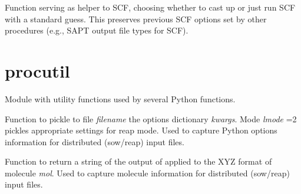 \documentclass[letterpaper,10pt,english]{sphinxmanual}
\begin{document}
\begin{fulllineitems}
\label{index:proc.scf_helper}
Function serving as helper to SCF, choosing whether to cast
up or just run SCF with a standard guess. This preserves
previous SCF options set by other procedures (e.g., SAPT
output file types for SCF).

\end{fulllineitems}



\section{procutil}
\label{index:procutil}\label{index:module-procutil}
Module with utility functions used by several Python functions.

\begin{fulllineitems}
\label{index:procutil.format_kwargs_for_input}
Function to pickle to file \emph{filename} the options dictionary
\emph{kwargs}. Mode \emph{lmode} =2 pickles appropriate settings for
reap mode. Used to capture Python options information for
distributed (sow/reap) input files.

\end{fulllineitems}


\begin{fulllineitems}
\label{index:procutil.format_molecule_for_input}
Function to return a string of the output of
{\hyperref[index:input.process_input]{}} applied to the XYZ
format of molecule \emph{mol}. Used to capture molecule
information for distributed (sow/reap) input files.

\end{fulllineitems}

\end{document}
